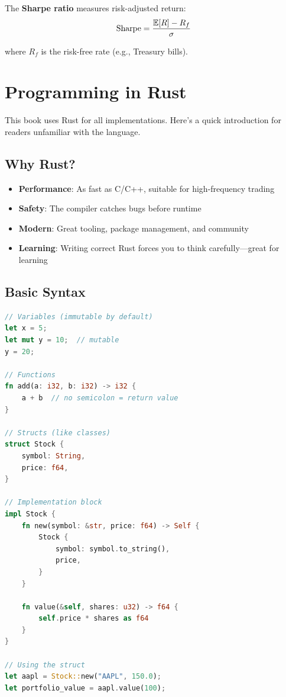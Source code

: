 The \textbf{Sharpe ratio} measures risk-adjusted return:
\[
\text{Sharpe} = \frac{\mathbb{E}[R] - R_f}{\sigma}
\]

where $R_f$ is the risk-free rate (e.g., Treasury bills).

\section{Programming in Rust}

This book uses Rust for all implementations. Here's a quick introduction for
readers unfamiliar with the language.

\subsection{Why Rust?}

\begin{itemize}
    \item \textbf{Performance}: As fast as C/C++, suitable for
      high-frequency trading
    \item \textbf{Safety}: The compiler catches bugs before runtime
    \item \textbf{Modern}: Great tooling, package management, and community
    \item \textbf{Learning}: Writing correct Rust forces you to think
      carefully---great for learning
\end{itemize}

\subsection{Basic Syntax}

\begin{lstlisting}[language=Rust]
// Variables (immutable by default)
let x = 5;
let mut y = 10;  // mutable
y = 20;

// Functions
fn add(a: i32, b: i32) -> i32 {
    a + b  // no semicolon = return value
}

// Structs (like classes)
struct Stock {
    symbol: String,
    price: f64,
}

// Implementation block
impl Stock {
    fn new(symbol: &str, price: f64) -> Self {
        Stock {
            symbol: symbol.to_string(),
            price,
        }
    }

    fn value(&self, shares: u32) -> f64 {
        self.price * shares as f64
    }
}

// Using the struct
let aapl = Stock::new("AAPL", 150.0);
let portfolio_value = aapl.value(100);
\end{lstlisting}

